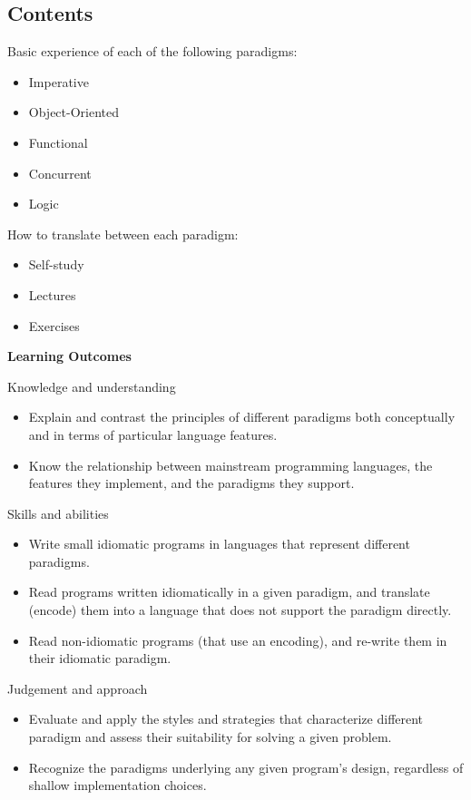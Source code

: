 \documentclass[utf8,compress,hyperref]{beamer}
\begin{document}
\subsection{Contents}
\begin{frame}
Basic experience of each of the following paradigms:
  \begin{itemize}
  \item Imperative 
  \item Object-Oriented
  \item Functional
  \item Concurrent
  \item Logic
  \end{itemize}

 How to translate between each paradigm:

\pause 

\begin{itemize}
\item Self-study
\item Lectures
\item Exercises
\end{itemize}

\end{frame}


\begin{frame}

\textbf{Learning Outcomes}

\scriptsize
Knowledge and understanding
\begin{itemize}
\item Explain and contrast the principles of different paradigms both
conceptually and in terms of particular language features.
\item Know the relationship between mainstream programming languages, the
features they implement, and the paradigms they support.
\end{itemize}


Skills and abilities

\begin{itemize}
\item Write small idiomatic programs in languages that represent
  different paradigms.

\item Read programs written idiomatically in a given paradigm, and
  translate (encode) them into a language that does not support the
  paradigm directly.

\item Read non-idiomatic programs (that use an encoding), and re-write
  them in their idiomatic paradigm.
\end{itemize}


Judgement and approach
\begin{itemize}
\item 
  Evaluate and apply the styles and strategies that characterize
  different paradigm and assess their suitability for solving a given
  problem.

\item 
  Recognize the paradigms underlying any given program's design,
  regardless of shallow implementation choices.
\end{itemize}
\end{frame}
\end{document}
